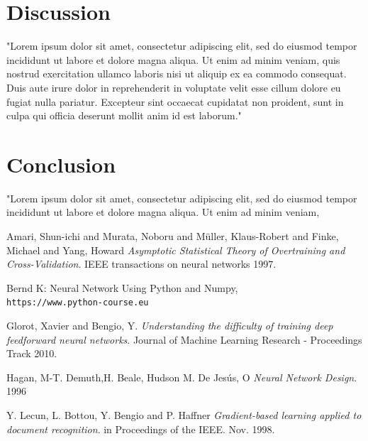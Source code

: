 \documentclass{proc}
\begin{document}
	\section{Discussion}
	"Lorem ipsum dolor sit amet, consectetur adipiscing elit, sed do eiusmod tempor incididunt ut labore et dolore magna aliqua. Ut enim ad minim veniam, quis nostrud exercitation ullamco laboris nisi ut aliquip ex ea commodo consequat. Duis aute irure dolor in reprehenderit in voluptate velit esse cillum dolore eu fugiat nulla pariatur. Excepteur sint occaecat cupidatat non proident, sunt in culpa qui officia deserunt mollit anim id est laborum."
	\section{Conclusion}
	"Lorem ipsum dolor sit amet, consectetur adipiscing elit, sed do eiusmod tempor incididunt ut labore et dolore magna aliqua. Ut enim ad minim veniam,
	\begin{thebibliography}{9}
		Amari, Shun-ichi and Murata, Noboru and Müller, Klaus-Robert and Finke, Michael and Yang, Howard 
		\textit{Asymptotic Statistical Theory of Overtraining and Cross-Validation}. 
		IEEE transactions on neural networks 1997.
		
		Bernd K: Neural Network Using Python and Numpy,
		\\\texttt{https://www.python-course.eu}
		
		Glorot, Xavier and Bengio, Y. 
		\textit{Understanding the difficulty of training deep feedforward neural networks}. 
		Journal of Machine Learning Research - Proceedings Track 2010.
		
		Hagan, M-T. Demuth,H. Beale, Hudson M. De Jesús, O
		\textit{Neural Network Design}.
		1996
		
		Y. Lecun, L. Bottou, Y. Bengio and P. Haffner
		\textit{Gradient-based learning applied to document recognition}.
		in Proceedings of the IEEE. Nov. 1998.
		
	\end{thebibliography}

	
\end{document}
